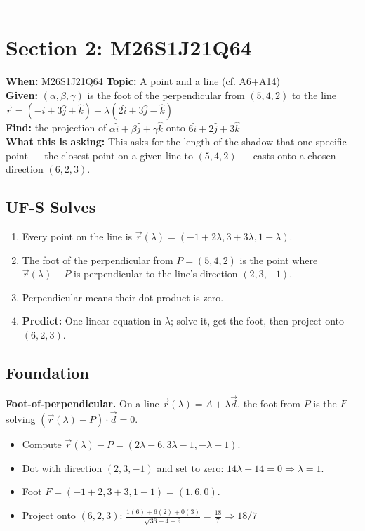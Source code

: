 \documentclass{article}
\begin{document}
\vspace{1em}
\hrule
\vspace{1em}

\section*{Section 2: M26S1J21Q64} %

\noindent \textbf{When:} M26S1J21Q64 \quad \textbf{Topic:} A point and a line (cf. A6+A14) \\ %
\textbf{Given:} $(\alpha,\beta,\gamma)$ is the foot of the perpendicular from $(5,4,2)$ to the line $\vec{r} = (-\hat{i}+3\hat{j}+\hat{k}) + \lambda(2\hat{i}+3\hat{j}-\hat{k})$ \\ %
\textbf{Find:} the projection of $\alpha\hat{i}+\beta\hat{j}+\gamma\hat{k}$ onto $6\hat{i}+2\hat{j}+3\hat{k}$ \\[0.5em] %
\textbf{What this is asking:} This asks for the length of the shadow that one specific point --- the closest point on a given line to $(5,4,2)$ --- casts onto a chosen direction $(6,2,3)$. %

\subsection*{UF-S Solves} %
\begin{enumerate}
    \item Every point on the line is $\vec{r}(\lambda) = (-1+2\lambda, 3+3\lambda, 1-\lambda)$. %
    \item The foot of the perpendicular from $P=(5,4,2)$ is the point where $\vec{r}(\lambda) - P$ is perpendicular to the line's direction $(2,3,-1)$. %
    \item Perpendicular means their dot product is zero. %
    \item \textbf{Predict:} One linear equation in $\lambda$; solve it, get the foot, then project onto $(6,2,3)$. %
\end{enumerate}

\subsection*{Foundation} %
\noindent \textbf{Foot-of-perpendicular.} On a line $\vec{r}(\lambda) = A + \lambda\vec{d}$, the foot from $P$ is the $F$ solving $(\vec{r}(\lambda) - P) \cdot \vec{d} = 0$. %
\begin{itemize}
    \item Compute $\vec{r}(\lambda) - P = (2\lambda - 6, 3\lambda - 1, -\lambda - 1)$. %
    \item Dot with direction $(2,3,-1)$ and set to zero: $14\lambda - 14 = 0 \Rightarrow \lambda = 1$. %
    \item Foot $F = (-1+2, 3+3, 1-1) = (1,6,0)$. %
    \item Project onto $(6,2,3)$: $\frac{1(6) + 6(2) + 0(3)}{\sqrt{36+4+9}} = \frac{18}{7} \Rightarrow \boxed{18/7}$ %
\end{itemize}
\end{document}
